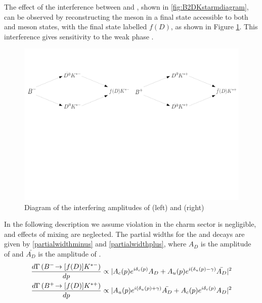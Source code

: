 The effect of the interference between \decay{\Bm}{\Dz\Kstarm} and \decay{\Bm}{\Dzb\Kstarm}, shown in \fig\ref{fig:B2DKstarmdiagram}, can be observed by reconstructing the \D meson in a final state accessible to both \Dz and \Dzb meson states, with the final state labelled $f(D)$, as shown in Figure \ref{paths}. This interference gives sensitivity to the weak phase \Pgamma.

\begin{figure}
\centering
\includegraphics[trim = 0mm 120mm 0mm 30mm,clip,width=\linewidth]{figures/theory/pathDiagrams.pdf}
\caption{Diagram of the interfering amplitudes of \decay{\Bm}{\D\Kstarm} (left) and \decay{\Bp}{\D\Kstarp} (right)}
\label{paths}
\end{figure}

In the following description we assume \CP violation in the charm sector is negligible, and effects of \D mixing are neglected. The partial widths for the \Bm and \Bp decays are given by \eqn\ref{partialwidthminus} and \ref{partialwidthplus}, where $A_D$ is the amplitude of  and $\bar{A_{D}}$ is the amplitude of .
\begin{align}
\frac{d\Gamma\left({{{B}^-}}\!\rightarrow [f(D)]{\ensuremath{{K}^{*-}}}\right)}{dp} &\propto | A_c(p) e^{i\delta_c(p)}A_{D} + A_u(p) e^{i(\delta_u(p) - \gamma)}\bar{A_{D}} |^2 \label{partialwidthminus} \\
\frac{d\Gamma\left({{{B}^+}}\!\rightarrow [f(D)]{\ensuremath{{K}^{*+}}}\right)}{dp} &\propto | A_u(p) e^{i(\delta_u(p) + \gamma)}\bar{A_{D}} + A_c(p) e^{i\delta_c(p)}A_{D} |^2 \label{partialwidthplus}
\end{align}

